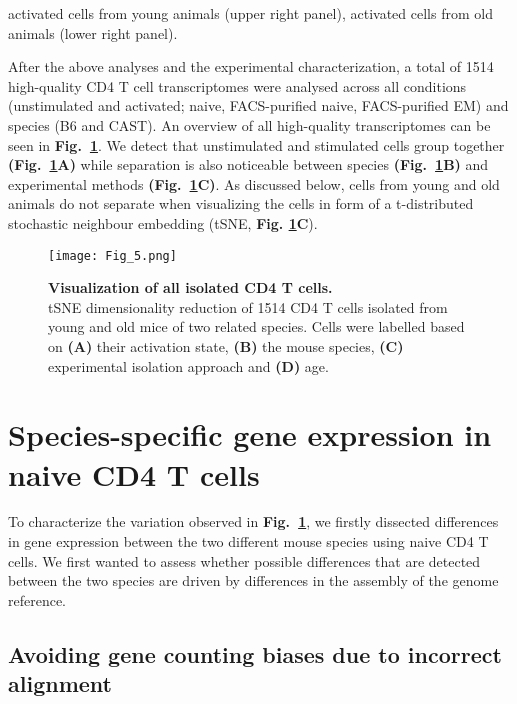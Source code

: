 {activated cells from young animals (upper right panel), activated cells from old animals (lower right panel).
\\}
\captionsetup[figure]{list=yes}

After the above analyses and the experimental characterization, a total of 1514 high-quality CD4\plus{} T cell transcriptomes were analysed across all conditions (unstimulated and activated; naive, FACS-purified naive, FACS-purified EM) and species (B6 and CAST). An overview of all high-quality transcriptomes can be seen in \textbf{Fig.~\ref{fig1:all_cells}}. We detect that unstimulated and stimulated cells group together \textbf{(Fig.~\ref{fig1:all_cells}A)} while separation is also noticeable between species \textbf{(Fig.~\ref{fig1:all_cells}B)} and experimental methods \textbf{(Fig.~\ref{fig1:all_cells}C)}. As discussed below, cells from young and old animals do not separate when visualizing the cells in form of a t-distributed stochastic neighbour embedding (tSNE, \textbf{Fig. \ref{fig1:all_cells}C}). 

\newpage

\begin{figure}[!hb]
\centering
\texttt{[image: Fig\_5.png]}
\caption[Visualization of all isolated CD4\plus{} T cells]{\textbf{Visualization of all isolated CD4\plus{} T cells.}\\
tSNE dimensionality reduction of 1514 CD4\plus{} T cells isolated from young and old mice of two related species. Cells were labelled based on \textbf{(A)} their activation state, \textbf{(B)} the mouse species, \textbf{(C)} experimental isolation approach and \textbf{(D)} age.}
\label{fig1:all_cells}
\end{figure}

\newpage

\section{Species-specific gene expression in naive CD4\plus{} T cells}

To characterize the variation observed in \textbf{Fig.~\ref{fig1:all_cells}}, we firstly dissected differences in gene expression between the two different mouse species using naive CD4\plus{} T cells. We first wanted to assess whether possible differences that are detected between the two species are driven by differences in the assembly of the genome reference.

\subsection{Avoiding gene counting biases due to incorrect alignment}

